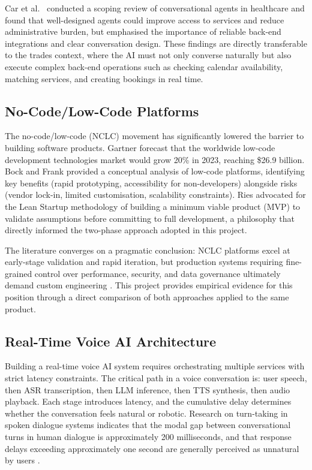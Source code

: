 \documentclass[conference]{IEEEtran}
\begin{document}
Car et al.\ \cite{b4} conducted a scoping review of conversational agents in healthcare and found that well-designed agents could improve access to services and reduce administrative burden, but emphasised the importance of reliable back-end integrations and clear conversation design. These findings are directly transferable to the trades context, where the AI must not only converse naturally but also execute complex back-end operations such as checking calendar availability, matching services, and creating bookings in real time.

\subsection{No-Code/Low-Code Platforms}

The no-code/low-code (NCLC) movement has significantly lowered the barrier to building software products. Gartner \cite{b17} forecast that the worldwide low-code development technologies market would grow 20\% in 2023, reaching \$26.9 billion. Bock and Frank \cite{b2} provided a conceptual analysis of low-code platforms, identifying key benefits (rapid prototyping, accessibility for non-developers) alongside risks (vendor lock-in, limited customisation, scalability constraints). Ries \cite{b18} advocated for the Lean Startup methodology of building a minimum viable product (MVP) to validate assumptions before committing to full development, a philosophy that directly informed the two-phase approach adopted in this project.

The literature converges on a pragmatic conclusion: NCLC platforms excel at early-stage validation and rapid iteration, but production systems requiring fine-grained control over performance, security, and data governance ultimately demand custom engineering \cite{b15, b8}. This project provides empirical evidence for this position through a direct comparison of both approaches applied to the same product.

\subsection{Real-Time Voice AI Architecture}

Building a real-time voice AI system requires orchestrating multiple services with strict latency constraints. The critical path in a voice conversation is: user speech, then ASR transcription, then LLM inference, then TTS synthesis, then audio playback. Each stage introduces latency, and the cumulative delay determines whether the conversation feels natural or robotic. Research on turn-taking in spoken dialogue systems indicates that the modal gap between conversational turns in human dialogue is approximately 200 milliseconds, and that response delays exceeding approximately one second are generally perceived as unnatural by users \cite{b19, b20}.
\end{document}

